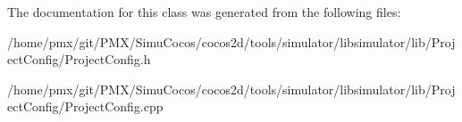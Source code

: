 The documentation for this class was generated from the following files\+:\begin{DoxyCompactItemize}
\item 
/home/pmx/git/\+P\+M\+X/\+Simu\+Cocos/cocos2d/tools/simulator/libsimulator/lib/\+Project\+Config/Project\+Config.\+h\item 
/home/pmx/git/\+P\+M\+X/\+Simu\+Cocos/cocos2d/tools/simulator/libsimulator/lib/\+Project\+Config/Project\+Config.\+cpp\end{DoxyCompactItemize}

